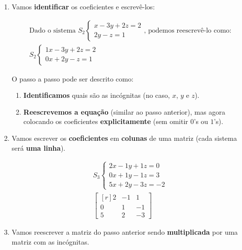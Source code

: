 \begin{enumerate}
    \item Vamos \textbf{identificar} os coeficientes e escrevê-los:
    
    \Example
    
    \begin{gather*}
        \text{Dado o sistema }S_2\begin{cases}
        x-3y+2z=2\\
        2y-z=1
        \end{cases} \text{, podemos reescrevê-lo como:}\\
        S_2\begin{cases}
        1x-3y+2z=2\\
        0x+2y-z=1
        \end{cases}
    \end{gather*}
    
    O passo a passo pode ser descrito como:
    
    \begin{enumerate}
        \item \textbf{Identificamos} quais são as incógnitas (no caso, $x$, $y$ e $z$).
        
        \item \textbf{Reescrevemos a equação} (similar ao passo anterior), mas agora colocando os coeficientes \textbf{explicitamente} (sem omitir $0$’s ou $1$’s).
        
    \end{enumerate}
    
    \item Vamos escrever os \textbf{coeficientes} em \textbf{colunas} de uma matriz (cada sistema será \textbf{uma linha}).
    
    \Example
    
    \begin{gather*}
        S_3\begin{cases}
        2x-1y+1z=0\\
        0x+1y-1z=3\\
        5x+2y-3z=-2
        \end{cases}\\
        \begin{bmatrix*}[r]
        2 & -1 & 1\\
        0 & 1 & -1\\
        5 & 2 & -3
        \end{bmatrix*}
    \end{gather*}
    
    \item Vamos reescrever a matriz do passo anterior sendo \textbf{multiplicada} por uma matriz com as incógnitas.
    

\end{enumerate}
